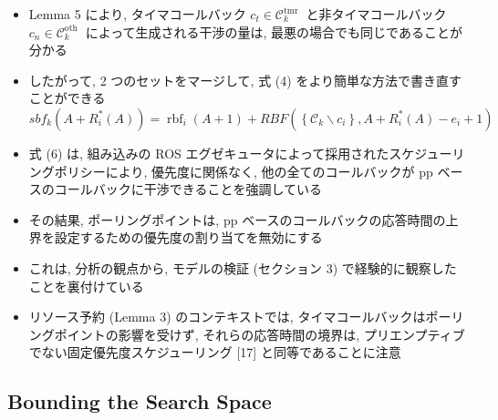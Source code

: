 \begin{frame}{}
    \begin{itemize}
        \item Lemma 5 により, タイマコールバック $c_{t} \in \mathcal{C}_{k}^{\text {tmr }}$ と非タイマコールバック $c_{n} \in \mathcal{C}_{k}^{\text {oth }}$ によって生成される干渉の量は, 最悪の場合でも同じであることが分かる
        \item したがって, 2 つのセットをマージして, 式 (4) をより簡単な方法で書き直すことができる
              \begin{equation*}
                  s b f_{k}\left(A+R_{i}^{*}(A)\right)=\operatorname{rbf}_{i}(A+1)+R B F\left(\left\{\mathcal{C}_{k} \backslash c_{i}\right\}, A+R_{i}^{*}(A)-e_{i}+1\right)
              \end{equation*}
    \end{itemize}
\end{frame}

\begin{frame}{}
    \begin{itemize}
        \item 式 (6) は, 組み込みの ROS エグゼキュータによって採用されたスケジューリングポリシーにより, 優先度に関係なく, 他の全てのコールバックが pp ベースのコールバックに干渉できることを強調している
        \item その結果, ポーリングポイントは, pp ベースのコールバックの応答時間の上界を設定するための優先度の割り当てを無効にする
        \item これは, 分析の観点から, モデルの検証 (セクション 3) で経験的に観察したことを裏付けている
        \item リソース予約 (Lemma 3) のコンテキストでは, タイマコールバックはポーリングポイントの影響を受けず, それらの応答時間の境界は, プリエンプティブでない固定優先度スケジューリング [17] と同等であることに注意
    \end{itemize}
\end{frame}


\subsection{Bounding the Search Space}
\label{ssec: bounding the search space}

